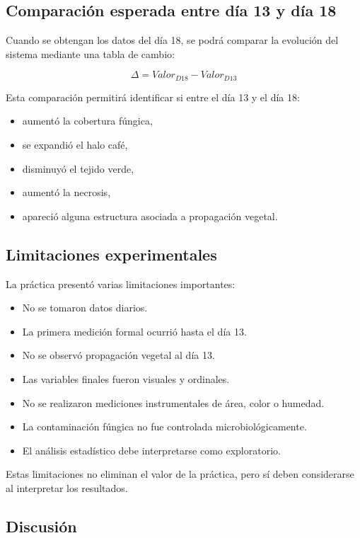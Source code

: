 \subsection{Comparación esperada entre día 13 y día 18}

Cuando se obtengan los datos del día 18, se podrá comparar la evolución del sistema mediante una tabla de cambio:

\[
\Delta = Valor_{D18} - Valor_{D13}
\]

Esta comparación permitirá identificar si entre el día 13 y el día 18:

\begin{itemize}
\item aumentó la cobertura fúngica,
\item se expandió el halo café,
\item disminuyó el tejido verde,
\item aumentó la necrosis,
\item apareció alguna estructura asociada a propagación vegetal.
\end{itemize}

\subsection{Limitaciones experimentales}

La práctica presentó varias limitaciones importantes:

\begin{itemize}
\item No se tomaron datos diarios.
\item La primera medición formal ocurrió hasta el día 13.
\item No se observó propagación vegetal al día 13.
\item Las variables finales fueron visuales y ordinales.
\item No se realizaron mediciones instrumentales de área, color o humedad.
\item La contaminación fúngica no fue controlada microbiológicamente.
\item El análisis estadístico debe interpretarse como exploratorio.
\end{itemize}

Estas limitaciones no eliminan el valor de la práctica, pero sí deben considerarse al interpretar los resultados.

\subsection{Discusión}


